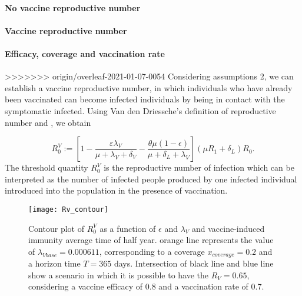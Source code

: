 \paragraph{No  vaccine reproductive number}
\paragraph{Vaccine reproductive number}
\paragraph{Efficacy, coverage and vaccination rate}

>>>>>>> origin/overleaf-2021-01-07-0054
%
%
Considering assumptions 2, we can establish a vaccine reproductive number,
in which individuals who have already been vaccinated
can become infected individuals by being in contact with the
symptomatic infected. Using Van den Driessche’s \cite{VandenDriessche2017a}
definition of reproductive number and \cite{Alexander2004}, we obtain

\begin{equation*}
 R_{0}^V := \left[ 1-\frac{\varepsilon \lambda_V}
 {\mu+\lambda_V+\delta_V}
 -\frac{\theta\mu(1-\epsilon)}{\mu+\delta_L+\lambda_V}\right]
 (\mu R_1+\delta_L)R_0.
\end{equation*}
%
The threshold quantity $R_0^V$ is the reproductive number of infection
which can be interpreted as the number of infected people produced
by one infected individual introduced into the population in the
presence of vaccination.


\begin{figure*}[tbh]
    \centering
      \texttt{[image: Rv\_contour]}
    \caption{
    Contour plot  of $R_0^V$ as a function of $ \epsilon $ and $ \lambda_V $ and  
        vaccine-induced
        immunity average time of half year. orange line represents the 
        value of $\lambda_{Vbase}=\num{0.000611}$, corresponding to a coverage 
        $x_{coverage} = \num{0.2}$ and a horizon time $T=\num{365}$ days.
        Intersection of black line and blue line show a scenario in which it is
        possible to have the $R_V=0.65$, considering a vaccine efficacy of 
        \num{0.8} and a vaccination rate 
        of \num{0.7}.}
    \label{fig:rvcontour1}
\end{figure*}


